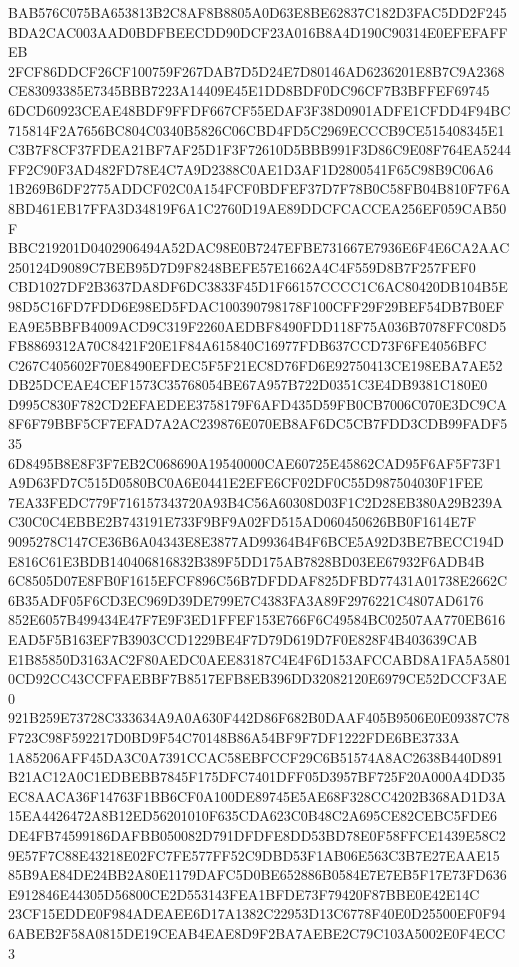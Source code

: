 \documentclass[UTF8,fontset=fandol,zihao=-4,a4paper]{ctexart}
\begin{document}
{{BAB576C075BA653813B2C8AF8B8805A0D63E8BE62837C182D3FAC5DD2F245BDA2CAC003AAD0BDFBEECDD90DCF23A016B8A4D190C90314E0EFEFAFFEB
2FCF86DDCF26CF100759F267DAB7D5D24E7D80146AD6236201E8B7C9A2368CE83093385E7345BBB7223A14409E45E1DD8BDF0DC96CF7B3BFFEF69745
6DCD60923CEAE48BDF9FFDF667CF55EDAF3F38D0901ADFE1CFDD4F94BC715814F2A7656BC804C0340B5826C06CBD4FD5C2969ECCCB9CE515408345E1
C3B7F8CF37FDEA21BF7AF25D1F3F72610D5BBB991F3D86C9E08F764EA5244FF2C90F3AD482FD78E4C7A9D2388C0AE1D3AF1D2800541F65C98B9C06A6
1B269B6DF2775ADDCF02C0A154FCF0BDFEF37D7F78B0C58FB04B810F7F6A8BD461EB17FFA3D34819F6A1C2760D19AE89DDCFCACCEA256EF059CAB50F
BBC219201D0402906494A52DAC98E0B7247EFBE731667E7936E6F4E6CA2AAC250124D9089C7BEB95D7D9F8248BEFE57E1662A4C4F559D8B7F257FEF0
CBD1027DF2B3637DA8DF6DC3833F45D1F66157CCCC1C6AC80420DB104B5E98D5C16FD7FDD6E98ED5FDAC100390798178F100CFF29F29BEF54DB7B0EF
EA9E5BBFB4009ACD9C319F2260AEDBF8490FDD118F75A036B7078FFC08D5FB8869312A70C8421F20E1F84A615840C16977FDB637CCD73F6FE4056BFC
C267C405602F70E8490EFDEC5F5F21EC8D76FD6E92750413CE198EBA7AE52DB25DCEAE4CEF1573C35768054BE67A957B722D0351C3E4DB9381C180E0
D995C830F782CD2EFAEDEE3758179F6AFD435D59FB0CB7006C070E3DC9CA8F6F79BBF5CF7EFAD7A2AC239876E070EB8AF6DC5CB7FDD3CDB99FADF535
6D8495B8E8F3F7EB2C068690A19540000CAE60725E45862CAD95F6AF5F73F1A9D63FD7C515D0580BC0A6E0441E2EFE6CF02DF0C55D987504030F1FEE
7EA33FEDC779F716157343720A93B4C56A60308D03F1C2D28EB380A29B239AC30C0C4EBBE2B743191E733F9BF9A02FD515AD060450626BB0F1614E7F
9095278C147CE36B6A04343E8E3877AD99364B4F6BCE5A92D3BE7BECC194DE816C61E3BDB140406816832B389F5DD175AB7828BD03EE67932F6ADB4B
6C8505D07E8FB0F1615EFCF896C56B7DFDDAF825DFBD77431A01738E2662C6B35ADF05F6CD3EC969D39DE799E7C4383FA3A89F2976221C4807AD6176
852E6057B499434E47F7E9F3ED1FFEF153E766F6C49584BC02507AA770EB616EAD5F5B163EF7B3903CCD1229BE4F7D79D619D7F0E828F4B403639CAB
E1B85850D3163AC2F80AEDC0AEE83187C4E4F6D153AFCCABD8A1FA5A58010CD92CC43CCFFAEBBF7B8517EFB8EB396DD32082120E6979CE52DCCF3AE0
921B259E73728C333634A9A0A630F442D86F682B0DAAF405B9506E0E09387C78F723C98F592217D0BD9F54C70148B86A54BF9F7DF1222FDE6BE3733A
1A85206AFF45DA3C0A7391CCAC58EBFCCF29C6B51574A8AC2638B440D891B21AC12A0C1EDBEBB7845F175DFC7401DFF05D3957BF725F20A000A4DD35
EC8AACA36F14763F1BB6CF0A100DE89745E5AE68F328CC4202B368AD1D3A15EA4426472A8B12ED56201010F635CDA623C0B48C2A695CE82CEBC5FDE6
DE4FB74599186DAFBB050082D791DFDFE8DD53BD78E0F58FFCE1439E58C29E57F7C88E43218E02FC7FE577FF52C9DBD53F1AB06E563C3B7E27EAAE15
85B9AE84DE24BB2A80E1179DAFC5D0BE652886B0584E7E7EB5F17E73FD636E912846E44305D56800CE2D553143FEA1BFDE73F79420F87BBE0E42E14C
23CF15EDDE0F984ADEAEE6D17A1382C22953D13C6778F40E0D25500EF0F946ABEB2F58A0815DE19CEAB4EAE8D9F2BA7AEBE2C79C103A5002E0F4ECC3
}}
\end{document}
